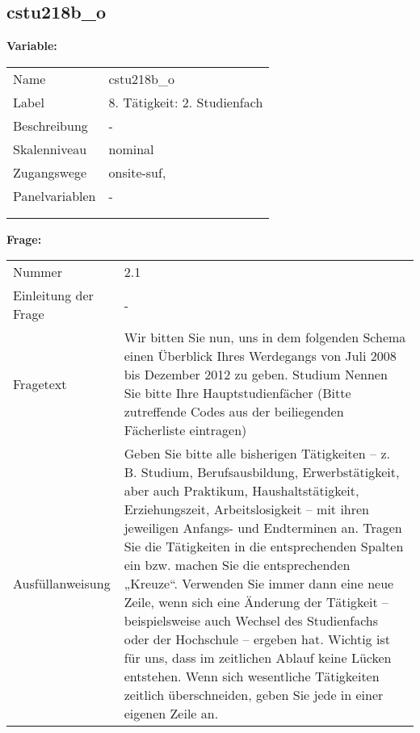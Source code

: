 	
	
	\subsection{cstu218b\_o}
	\label{subSection:cstu218b_o}

	\noindent\textbf{Variable:}\\
		\begin{tabular}{lL{11.3cm}}
			\label{tableVariable:cstu218b_o}
			Name & cstu218b\_o \\
			Label & 8. Tätigkeit: 2. Studienfach \\
			Beschreibung & - \\
			Skalenniveau & nominal \\
			Zugangswege &
				onsite-suf,
 \\
			Panelvariablen & -
			 \\
			 \\
 \\
		\end{tabular}

		\vspace*{1 cm}
		\noindent\textbf{Frage:}\\
		\begin{tabular}{lL{11.3cm}}
			\label{tableQuestion:cstu218b_o}
			Nummer & 2.1 \\
			Einleitung der Frage & - \\
			Fragetext & Wir bitten Sie nun, uns in dem folgenden Schema einen Überblick Ihres Werdegangs von Juli 2008 bis Dezember 2012 zu geben.
Studium
Nennen Sie bitte Ihre Hauptstudienfächer
(Bitte zutreffende Codes aus der beiliegenden Fächerliste eintragen) \\
			Ausfüllanweisung & Geben Sie bitte alle bisherigen Tätigkeiten – z. B. Studium, Berufsausbildung, Erwerbstätigkeit, aber auch Praktikum, Haushaltstätigkeit,
Erziehungszeit, Arbeitslosigkeit – mit ihren jeweiligen Anfangs- und Endterminen an. Tragen Sie die Tätigkeiten in die entsprechenden Spalten ein bzw. machen Sie die entsprechenden „Kreuze“. Verwenden Sie immer dann eine neue Zeile, wenn sich eine Änderung der Tätigkeit – beispielsweise auch Wechsel des Studienfachs oder der Hochschule – ergeben hat. Wichtig ist für uns, dass im zeitlichen Ablauf keine Lücken entstehen. Wenn sich wesentliche Tätigkeiten zeitlich überschneiden, geben Sie jede in einer eigenen Zeile an. \\
		\end{tabular}






